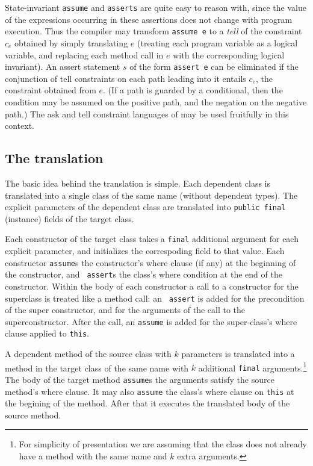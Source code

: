 \documentclass{article}
\begin{document}
State-invariant {\tt assume} and {\tt asserts} are quite easy to
reason with, since the value of the expressions occurring in these
assertions does not change with program execution. Thus the compiler
may transform {\tt assume e} to a {\em tell} of the constraint $c_e$
obtained by simply translating $e$ (treating each program variable as
a logical variable, and replacing each method call in $e$ with the
corresponding logical invariant). An assert statement $s$ of the form
{\tt assert e} can be eliminated if the conjunction of tell
constraints on each path leading into it entails $c_e$, the constraint
obtained from $e$. (If a path is guarded by a conditional, then the
condition may be assumed on the positive path, and the negation on the
negative path.) The ask and tell constraint languages of
\cite{my-thesis-book} may be used fruitfully in this context.


\subsection{ The translation }

The basic idea behind the translation is simple. Each dependent class
is translated into a single class of the same name (without dependent
types). The explicit parameters of the dependent class are translated
into {\tt public final} (instance) fields of the target class.

Each constructor of the target class takes a {\tt final} additional
argument for each explicit parameter, and initializes the correspoding
field to that value. Each constructor {\tt assume}s the constructor's
where clause (if any) at the beginning of the constructor, and {\tt
assert}s the class's where condition at the end of the
constructor. Within the body of each constructor a call to a
constructor for the superclass is treated like a method call: an {\tt
assert} is added for the precondition of the super constructor, and
for the arguments of the call to the superconstructor. After the call,
an {\tt assume} is added for the super-class's where clause applied to
{\tt this}.

A dependent method of the source class with $k$ parameters is
translated into a method in the target class of the same name with $k$
additional {\tt final} arguments.\footnote{For simplicity of
presentation we are assuming that the class does not already have a
method with the same name and $k$ extra arguments.} The body of the
target method {\tt assume}s the arguments satisfy the source method's
where clause.  It may also {\tt assume} the class's where clause on
{\tt this} at the begining of the method.  After that it executes the
translated body of the source method.
\end{document}
